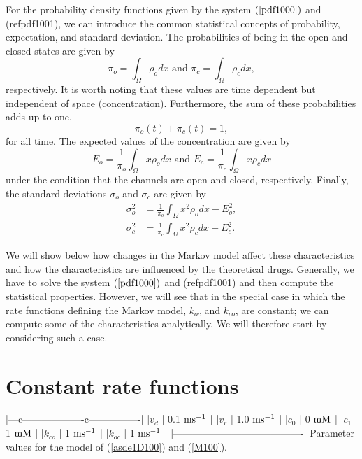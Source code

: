 \bigskip For the probability density functions given by the system $\left(
\ref{pdf1000}\right)$ and (ref{pdf1001}), we can introduce the common statistical
concepts of probability, expectation, and standard deviation. The probabilities of
being in the open and closed states are given by
\begin{equation}
\pi_{o}=\int_{\Omega}\rho_{o}dx \text{ and }\pi_{c}=\int_{\Omega}\rho_{c}dx,
\label{probability}
\end{equation}
respectively. It is worth noting that these values are time dependent but
independent of space (concentration). Furthermore, the sum of these
probabilities adds up to one,
\[
\pi_{o}\left(  t\right)  +\pi_{c}\left(  t\right)  =1,
\]
for all time. The expected values of the concentration are given by
\begin{equation}
E_{o}=\frac{1}{\pi_{o}}\int_{\Omega}x\rho_{o}dx \text{ and }E_{c}=\frac{1}
{\pi_{c}}\int_{\Omega}x\rho_{c}dx \label{expectation}
\end{equation}
under the condition that the channels are open and closed, respectively. Finally, the standard deviations $\sigma_{o}$ and $\sigma_{c}$ are given by
\begin{align}
\sigma_{o}^{2}  &  =\frac{1}{\pi_{o}}\int_{\Omega}x^{2}\rho_{o}dx-E_{o}^{2},\label{stdvo}\\
\sigma_{c}^{2}  &  =\frac{1}{\pi_{c}}\int_{\Omega}x^{2}\rho_{c}dx-E_{c}^{2}. \label{stdvc}
\end{align}

We will show below how changes in the Markov model affect these
characteristics and how the characteristics are influenced by the
theoretical drugs. Generally, we have to solve the system $\left(
\ref{pdf1000}\right)$ and (ref{pdf1001}) and then compute the statistical
properties. However, we will see that in the special case in which the rate functions
defining the Markov model, $k_{oc}$ and $k_{co}$, are constant; we can compute some of
the characteristics analytically.  We will therefore start by considering such a case.



\section{Constant rate functions}
|---c-------------------c----------------|
|$v_d $    | 0.1 $\rm{ms^{-1}}$          |
|$v_r $    | 1.0 $\rm{ms^{-1}}$          |
|$c_0 $    | 0 $\rm{mM}$                 |
|$c_1 $    | 1 $\rm{mM}$                 |
|$k_{co} $ | 1 $\rm{ms^{-1}}$            |
|$k_{oc} $ | 1 $\rm{ms^{-1}}$            |
|----------------------------------------|
Parameter values for the model of (\ref{asde1D100}) and (\ref{M100}).
\label{tab:nodrug}

